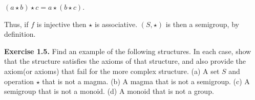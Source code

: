 \documentclass[12pt, a4paper]{article}
\begin{document}
\begin{flushright}
$(a\star b)\star c=a\star (b\star c)$.\hfil\hfil
\linebreak
\end{flushright}

\begin{flushleft}
Thus, if $f$ is injective then $\star$ is associative. $(S, \star)$ is then a semigroup, by definition.\linebreak
\hfil
\hfil
\hfil
\linebreak
\end{flushleft}

\begin{flushleft}
\hfil\textbf{Exercise 1.5.} Find an example of the following structures. In each case, show\linebreak
that the structure satisfies the axioms of that structure, and also provide the axiom\linebreak (or axioms) that fail for the more complex structure.\vspace*{3mm}\linebreak
\hspace*{10mm}(a) A set $S$ and operation $\star$ that is not a magma.\linebreak
\hspace*{10mm}(b) A magma that is not a semigroup.\linebreak
\hspace*{10mm}(c) A semigroup that is not a monoid.\linebreak
\hspace*{10mm}(d) A monoid that is not a group.\linebreak
\end{flushleft}
\end{document}
